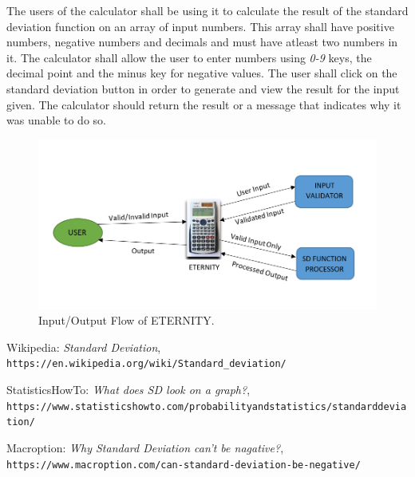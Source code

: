 \documentclass[12pt,letterpaper]{report}
\begin{document}
The users of the calculator shall be using it to calculate the result of the standard deviation function on an array of input numbers. This array shall have positive numbers, negative numbers and decimals and must have atleast two numbers in it. The calculator shall allow the user to enter numbers using \textit{0-9} keys, the decimal point and the minus key for negative values. The user shall click on the standard deviation button in order to generate and view the result for the input given. The calculator should return the result or a message that indicates why it was unable to do so.

\begin{figure}[h]
 \centering
\includegraphics[width=15cm]{contextuse}
  \caption{Input/Output Flow of ETERNITY.}
\end{figure}




\begin{thebibliography}{9}

    Wikipedia: 
    \textit{Standard Deviation},
    \texttt{https://en.wikipedia.org/wiki/Standard\_deviation/}
   
    StatisticsHowTo:
    \textit{What does SD look on a graph?},
    \texttt{https://www.statisticshowto.com/probability\-and\-statistics/standard\-deviation/}

    Macroption: 
    \textit{Why Standard Deviation can't be nagative?},  
    \texttt{https://www.macroption.com/can-standard-deviation-be-negative/}
    
 
    
\end{thebibliography}
\end{document}
